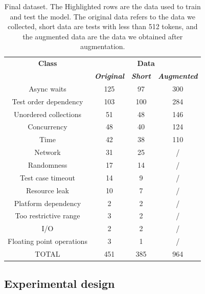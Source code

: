 \begin{table}[htbp]
\centering
\caption{Final dataset. The Highlighted rows are the data used to train and test the model. The original data refers to the data we collected, short data are tests with less than 512 tokens, and the augmented data are the data we obtained after augmentation. }
\begin{tabular}{|c|c|c|c|}
\hline
\textbf{Class}&\multicolumn{3}{|c|}{\textbf{Data}} \\
\cline{2-4} 
\textbf{} & \textbf{\textit{Original}}& 
\textbf{\textit{Short}} &
\textbf{\textit{Augmented}}  \\
\hline
	
\rowcolor{Gray}
Async waits & 125 & 97 &  300\\
\hline
\rowcolor{Gray}
Test order dependency & 103 & 100 &  284\\ 
\hline
\rowcolor{Gray}
Unordered collections & 51 & 48 & 146 \\
\hline
\rowcolor{Gray}
Concurrency & 48 & 40 & 124 \\
\hline
\rowcolor{Gray}
Time & 42 & 38 & 110 \\
\hline
Network & 31 & 25 & /\\
\hline
Randomness & 17 & 14 &  / \\
\hline
Test case timeout & 14 & 9 &  / \\
\hline 
Resource leak & 10 & 7 &  / \\
\hline
Platform dependency & 2 & 2 &  / \\
\hline 
Too restrictive range & 3 & 2 & / \\
\hline 
I/O & 2 & 2 & / \\
\hline 
Floating point operations & 3 & 1 & /\\
\hline

TOTAL & 451 & 385 &  964 \\
\hline
\end{tabular}
\label{tabData}
\end{table}
\vspace{1mm}


\subsection{Experimental design}
